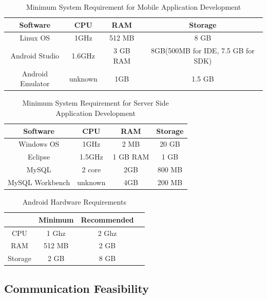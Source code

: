 \begin{table}[!ht]
\centering
\caption{Minimum System Requirement for Mobile Application Development}
\label{minreq}
\begin{tabular}{|c|c|c|c|}
\hline
\textbf{Software}& \textbf{CPU} & \textbf{RAM}  & \textbf{Storage} \\ \hline
Linux OS\cite{linuxMinimumSystemRequirements} & 1GHz & 512 MB & 8 GB \\ \hline
Android Studio\cite{androidMinimumSystemRequirements} & 1.6GHz & 3 GB RAM  & 8GB(500MB for IDE, 7.5 GB for SDK) \\ \hline
Android Emulator\cite{androidMinimumSystemRequirements} & unknown & 1GB & 1.5 GB \\ \hline
\end{tabular}
\end{table}

\begin{table}[!ht]
\centering
\caption{Minimum System Requirement for Server Side Application Development}
\label{minreq}
\begin{tabular}{|c|c|c|c|}
\hline
\textbf{Software}& \textbf{CPU} & \textbf{RAM}  & \textbf{Storage} \\ \hline
Windows OS\cite{microsoft} & 1GHz & 2 MB & 20 GB \\ \hline
Eclipse\cite{androidMinimumSystemRequirements} & 1.5GHz & 1 GB RAM  & 1 GB  \\ \hline
MySQL\cite{mysql} & 2 core & 2GB & 800 MB \\ \hline
MySQL Workbench\cite{mysql} & unknown & 4GB & 200 MB \\ \hline
\end{tabular}
\end{table}

\begin{table}[!ht]
\centering
\caption{Android Hardware Requirements}
\label{androidhardware}
\begin{tabular}{|c|c|c|c|}
\hline
            & \textbf{Minimum}    & \textbf{Recommended} \\\hline
CPU & 1 Ghz      & 2 Ghz     \\\hline
RAM       & 512 MB       & 2 GB        \\\hline
Storage   & 2 GB       & 8 GB       \\\hline
\end{tabular}
\end{table}

\subsection{Communication Feasibility}


